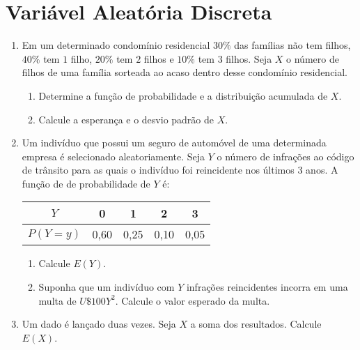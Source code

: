 \thispagestyle{cap1}

\section*{Variável Aleatória Discreta}

\begin{enumerate}
\item Em um determinado condomínio residencial $30\%$ das famílias não tem filhos, $40\%$ tem $1$ filho, $20\%$ tem $2$ filhos e $10\%$ tem $3$ filhos. Seja $X$ o número de filhos de uma família sorteada ao acaso dentro desse condomínio residencial.

    \begin{enumerate}[label=\alph*)]
		\item Determine a função de probabilidade e a distribuição acumulada de $X$.
		\item Calcule a esperança e o desvio padrão de $X$.
	\end{enumerate}

	\solv{}

\item Um indivíduo que possui um seguro de automóvel de uma determinada empresa é selecionado aleatoriamente. Seja $Y$ o número de infrações ao código de trânsito para as quais o indivíduo foi reincidente nos últimos $3$ anos. A função de de probabilidade de $Y$ é:
    \begin{table}[htpb]
        \centering
        \begin{tabular}{|c|c|c|c|c|}
            \hline
            $Y$      & 0    & 1    & 2    & 3    \\ \hline
            $P(Y=y)$ & 0,60 & 0,25 & 0,10 & 0,05 \\ \hline
        \end{tabular}
    \end{table}
    
    \begin{enumerate}[label=\alph*)]
		\item Calcule $E(Y)$.
		\item Suponha que um indivíduo com $Y$ infrações reincidentes incorra em uma multa de $U\$ 100Y^{2}$. Calcule o valor esperado da multa.
	\end{enumerate}

\setcounter{enumi}{4}
\item Um dado é lançado duas vezes. Seja $X$ a soma dos resultados. Calcule $E(X)$.
	

\end{enumerate}
